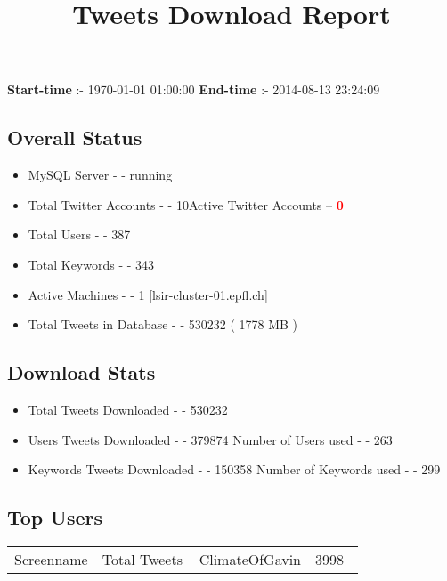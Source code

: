 \documentclass{article}\usepackage[T1]{fontenc}
\begin{document}
\title{\textbf{Tweets Download Report}}
               \date{}
                \maketitle
               \centerline{\textbf{Start-time} :- 1970-01-01 01:00:00 \hspace{40pt} \textbf{End-time} :- 2014-08-13 23:24:09}               \subsection*{Overall Status}                \begin{itemize}                \item MySQL Server - - running               \item Total Twitter Accounts - - 10\newline Active Twitter Accounts -- \textcolor{red}{\textbf{0}}               \item Total Users - - 387               \item Total Keywords - - 343               \item Active Machines - - 1 [lsir-cluster-01.epfl.ch]               \item Total Tweets in Database - - 530232 ( 1778 MB )               \end{itemize}               \subsection*{Download Stats}                \begin{itemize}                \item Total Tweets Downloaded - - 530232               \item Users Tweets Downloaded - - 379874 \newline Number of Users used - - 263               \item Keywords Tweets Downloaded - - 150358 \newline Number of Keywords used - - 299              \end{itemize}              \subsection*{Top Users}\begin{center}         \begin{tabular}{|c|c|}         \hline         Screenname & Total Tweets \ \hline
ClimateOfGavin & 3998\ \hline

\end{tabular}
\end{center}
\end{document}
